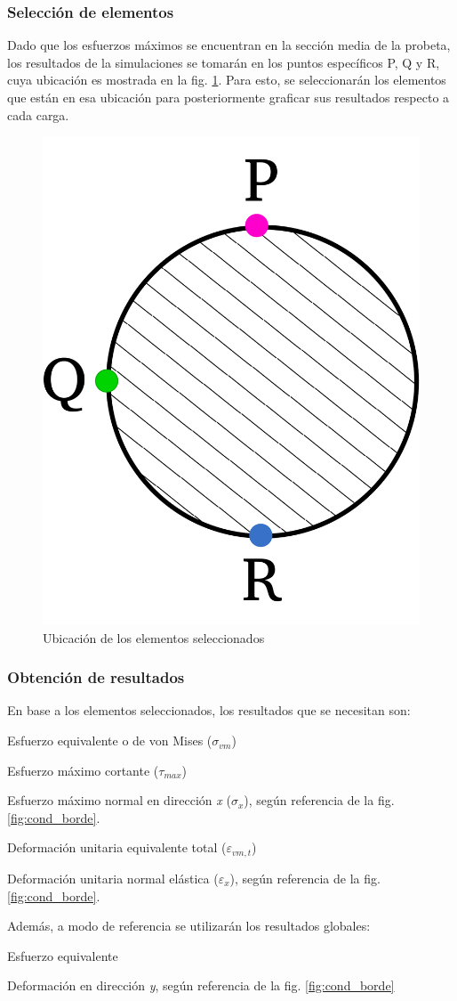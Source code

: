 \newpage

\subsubsection{Selección de elementos}
Dado que los esfuerzos máximos se encuentran en la sección media de la probeta, los resultados de la simulaciones se tomarán en los puntos específicos P, Q y R, cuya ubicación es mostrada en la fig. \ref{fig:diag_pqr}. Para esto, se seleccionarán los elementos que están en esa ubicación para posteriormente graficar sus resultados respecto a cada carga.

\begin{figure}[h]
\centering
\includegraphics[width=0.3\linewidth]{Imagenes/diagelem_pqr.pdf}
\caption{Ubicación de los elementos seleccionados}
\label{fig:diag_pqr}
\end{figure}

\subsubsection{Obtención de resultados}
En base a los elementos seleccionados, los resultados que se necesitan son:
\begin{itemize*}
	\item Esfuerzo equivalente o de von Mises ($\sigma_{vm}$)
	\item Esfuerzo máximo cortante ($\tau_{max}$)
	\item Esfuerzo máximo normal en dirección \textit{x} ($\sigma_{x}$), según referencia de la fig. \ref{fig:cond_borde}.
	\item Deformación unitaria equivalente total ($\varepsilon_{vm,t}$)
	\item Deformación unitaria normal elástica ($\varepsilon_{x}$),  según referencia de la fig. \ref{fig:cond_borde}.
\end{itemize*}

Además, a modo de referencia se utilizarán los resultados globales:
\begin{itemize*}
	\item Esfuerzo equivalente
	\item Deformación en dirección \textit{y}, según referencia de la fig. \ref{fig:cond_borde}
\end{itemize*}
